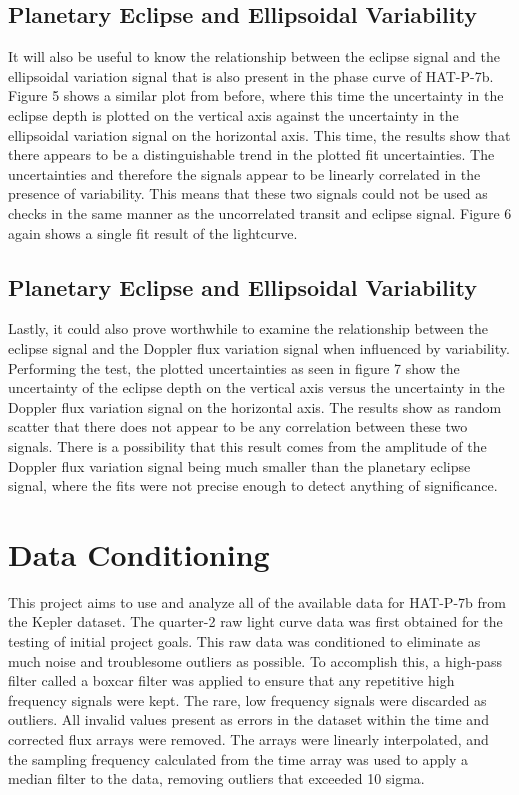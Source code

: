 \documentclass[manuscript]{aastex}
\begin{document}
\subsection{Planetary Eclipse and Ellipsoidal Variability} 

	It will also be useful to know the relationship between the eclipse signal and the ellipsoidal variation signal that is also present in the phase curve of HAT-P-7b. Figure 5 shows a similar plot from before, where this time the uncertainty in the eclipse depth is plotted on the vertical axis against the uncertainty in the ellipsoidal variation signal on the horizontal axis. This time, the results show that there appears to be a distinguishable trend in the plotted fit uncertainties. The uncertainties and therefore the signals appear to be linearly correlated in the presence of variability. This means that these two signals could not be used as checks in the same manner as the uncorrelated transit and eclipse signal. Figure 6 again shows a single fit result of the lightcurve.
   

\subsection{Planetary Eclipse and Ellipsoidal Variability} 

Lastly, it could also prove worthwhile to examine the relationship between the eclipse signal and the Doppler flux variation signal when influenced by variability. Performing the test, the plotted uncertainties as seen in figure 7 show the uncertainty of the eclipse depth on the vertical axis versus the uncertainty in the Doppler flux variation signal on the horizontal axis. The results show as random scatter that there does not appear to be any correlation between these two signals. There is a possibility that this result comes from the amplitude of the Doppler flux variation signal being much smaller than the planetary eclipse signal, where the fits were not precise enough to detect anything of significance. 


\section{Data Conditioning}

	This project aims to use and analyze all of the available data for HAT-P-7b from the Kepler dataset. The quarter-2 raw light curve data was first obtained for the testing of initial project goals. This raw data was conditioned to eliminate as much noise and troublesome outliers as possible. To accomplish this, a high-pass filter called a boxcar filter was applied to ensure that any repetitive high frequency signals were kept. The rare, low frequency signals were discarded as outliers. All invalid values present as errors in the dataset within the time and corrected flux arrays were removed. The arrays were linearly interpolated, and the sampling frequency calculated from the time array was used to apply a median filter to the data, removing outliers that exceeded 10 sigma. 
    
\end{document}
